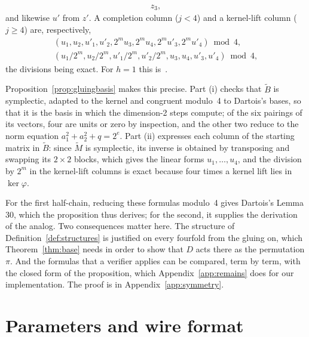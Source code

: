 \documentclass[version=preprint]{iacrcc}
\begin{document}
\begin{proposition}
\begin{enumerate}[label=(\roman*)]
\begin{gather*}
                z_3,
            \end{gather*}
            and likewise $u'$ from $z'$. A completion column ($j < 4$) and a
            kernel-lift column ($j \ge 4$) are, respectively,
            \begin{gather*}
            (u_1, u_2, u'_1, u'_2, 2^m u_3, 2^m u_4, 2^m u'_3, 2^m u'_4) \bmod 4, \\
            (u_1/2^m, u_2/2^m, u'_1/2^m, u'_2/2^m, u_3, u_4, u'_3, u'_4) \bmod 4,
            \end{gather*}
            the divisions being exact. For $h = 1$ this is~\cite[Lemma 30]{Dar24}.
        \end{enumerate}
    \end{proposition}

    Proposition~\ref{prop:gluingbasis} makes this precise. Part (i) checks
    that $\tilde B$ is symplectic, adapted to the kernel and congruent
    modulo~4 to Dartois's bases, so that it is the basis in which the
    dimension-2 steps compute; of the six pairings of its vectors, four are
    units or zero by inspection, and the other two reduce to the norm equation
    $a_1^2 + a_2^2 + q = 2^e$. Part (ii) expresses each column of the starting
    matrix in $\tilde B$: since $\tilde M$ is symplectic, its inverse is
    obtained by transposing and swapping its $2 \times 2$ blocks, which gives
    the linear forms $u_1, \ldots, u_4$, and the division by $2^m$ in the
    kernel-lift columns is exact because four times a kernel lift lies in
    $\ker\varphi$.

    For the first half-chain, reducing these formulas modulo~4 gives Dartois's
    Lemma 30, which the proposition thus derives; for the second, it supplies
    the derivation of the analog. Two consequences matter here. The structure
    of Definition~\ref{def:structures} is justified on every fourfold from the
    gluing on, which Theorem~\ref{thm:base} needs in order to show that $D$
    acts there as the permutation $\pi$. And the formulas that a verifier
    applies can be compared, term by term, with the closed form of the
    proposition, which Appendix~\ref{app:remains} does for our implementation.
    The proof is in Appendix~\ref{app:symmetry}.

    \section{Parameters and wire format}
    \label{sec:engineering}
\end{document}
